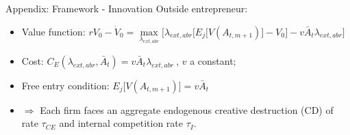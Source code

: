 \documentclass[11pt]{beamer}
\begin{document}
\begin{frame}{Appendix: Framework - Innovation}
Outside entrepreneur:
	\begin{itemize}\itemsep12pt	
	\item Value function: $rV_0 - \dot{V}_0 = \max\limits_{\lambda_{ext, abr}}\big[\lambda_{ext, abr}\big[E_j\big[V(A_{t, m+1})\big] - V_0\big] - v \bar{A}_{t}\lambda_{ext, abr}\big]$
 	\item Cost: $C_E(\lambda_{ext, abr}, \bar{A}_{t}) = v \bar{A}_{t} \lambda_{ext, abr}\:$, $v$ a constant;
	\item Free entry condition: $E_j\big[V(A_{t, m+1})\big] = v \bar{A}_{t}$
	\item $\Rightarrow$ Each firm faces an aggregate endogenous creative destruction (CD) of rate $\tau_{CE}$ and internal competition rate $\tau_I$.
	\end{itemize}
\end{frame}
\end{document}
